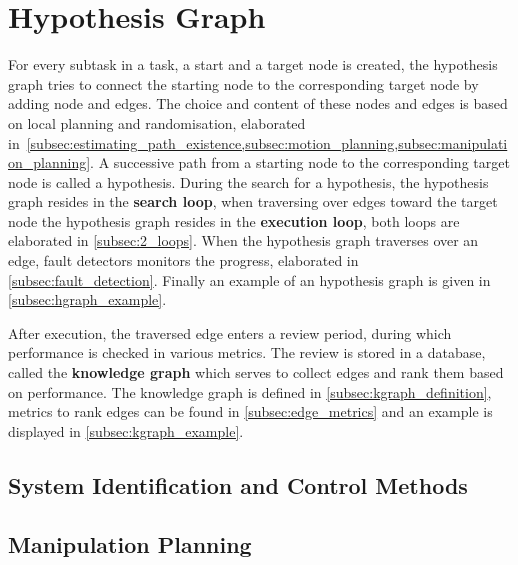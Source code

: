 \section{Hypothesis Graph}
\label{sec:hgraph}
For every subtask in a task, a start and a target node is created, the hypothesis graph tries to connect the starting node to the corresponding target node by adding node and edges. The choice and content of these nodes and edges is based on local planning and randomisation, elaborated in~\cref{subsec:estimating_path_existence,subsec:motion_planning,subsec:manipulation_planning}. A successive path from a starting node to the corresponding target node is called a hypothesis. During the search for a hypothesis, the hypothesis graph resides in the \textbf{search loop}, when traversing over edges toward the target node the hypothesis graph resides in the \textbf{execution loop}, both loops are elaborated in \cref{subsec:2_loops}. When the hypothesis graph traverses over an edge, fault detectors monitors the progress, elaborated in \cref{subsec:fault_detection}. Finally an example of an hypothesis graph is given in \cref{subsec:hgraph_example}.\bs

After execution, the traversed edge enters a review period, during which performance is checked in various metrics. The review is stored in a database, called the \textbf{knowledge graph} which serves to collect edges and rank them based on performance. The knowledge graph is defined in \cref{subsec:kgraph_definition}, metrics to rank edges can be found in \cref{subsec:edge_metrics} and an example is displayed in \cref{subsec:kgraph_example}.




\subsection{System Identification and Control Methods}
\label{subsec:sys_iden_and_control_methods}




\subsection{Manipulation Planning}
\label{subsec:manipulation_planning}
